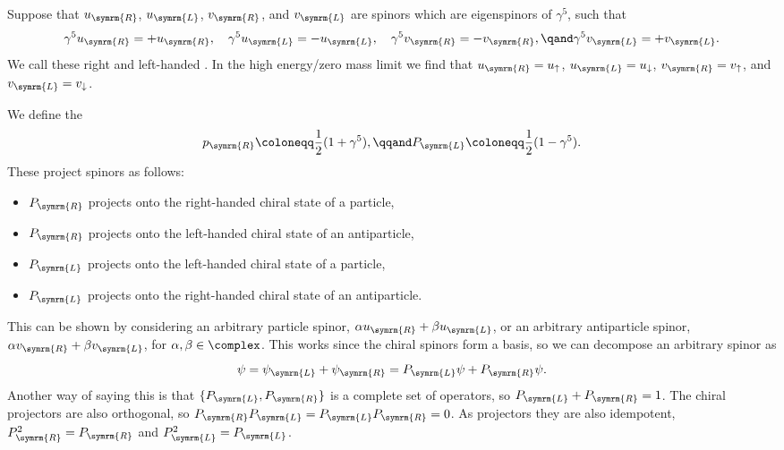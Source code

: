 \documentclass[fleqn]{NotesClass}
\newcommand{\Left}{\symrm{L}}
\newcommand{\Right}{\symrm{R}}
\begin{document}
    Suppose that \(u_{\Right}\), \(u_{\Left}\), \(v_{\Right}\), and \(v_{\Left}\) are spinors which are eigenspinors of \(\gamma^5\), such that
    \begin{equation}
        \gamma^5 u_{\Right} = +u_{\Right}, \quad \gamma^5u_{\Left} = -u_{\Left}, \quad \gamma^5v_{\Right} = -v_{\Right}, \qand \gamma^5 v_{\Left} = +v_{\Left}.
    \end{equation}
    We call these right and left-handed .
    In the high energy/zero mass limit we find that \(u_{\Right} = u_{\uparrow}\), \(u_{\Left} = u_{\downarrow}\), \(v_{\Right} = v_{\uparrow}\), and \(v_{\Left} = v_{\downarrow}\).
    
    We define the 
    \begin{equation}
        p_{\Right} \coloneqq \frac{1}{2}(1 + \gamma^5), \qqand P_{\Left} \coloneqq \frac{1}{2}(1 - \gamma^5).
    \end{equation}
    These project spinors as follows:
    \begin{itemize}
        \item \(P_{\Right}\) projects onto the right-handed chiral state of a particle,
        \item \(P_{\Right}\) projects onto the left-handed chiral state of an antiparticle,
        \item \(P_{\Left}\) projects onto the left-handed chiral state of a particle,
        \item \(P_{\Left}\) projects onto the right-handed chiral state of an antiparticle.
    \end{itemize}
    This can be shown by considering an arbitrary particle spinor, \(\alpha u_{\Right} + \beta u_{\Left}\), or an arbitrary antiparticle spinor, \(\alpha v_{\Right} + \beta v_{\Left}\), for \(\alpha, \beta \in \complex\).
    This works since the chiral spinors form a basis, so we can decompose an arbitrary spinor as
    \begin{equation}
        \psi = \psi_{\Left} + \psi_{\Right} = P_{\Left}\psi + P_{\Right}\psi.
    \end{equation}
    Another way of saying this is that \(\{P_{\Left}, P_{\Right}\}\) is a complete set of operators, so \(P_{\Left} + P_{\Right} = 1\).
    The chiral projectors are also orthogonal, so \(P_{\Right} P_{\Left} = P_{\Left}P_{\Right} = 0\).
    As projectors they are also idempotent, \(P_{\Right}^2 = P_{\Right}\) and \(P_{\Left}^2 = P_{\Left}\).
    
\end{document}
